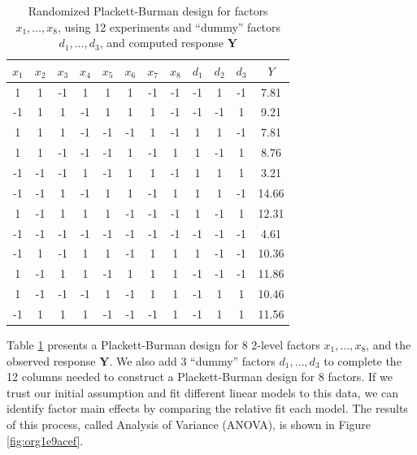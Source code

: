 \documentclass[conference]{IEEEtran}
\begin{document}
\begin{table}[ht]
\centering
\caption{Randomized Plackett-Burman design for factors $x_1, \dots, x_8$, using 12 experiments and ``dummy'' factors $d_1, \dots, d_3$, and computed response $\mathbf{Y}$}
\label{tab:plackett}
\begingroup\scriptsize
\begin{tabular}{cccccccccccc}
  \toprule
$x_1$ & $x_2$ & $x_3$ & $x_4$ & $x_5$ & $x_6$ & $x_7$ & $x_8$ & $d_1$ & $d_2$ & $d_3$ & $Y$ \\
  \midrule
1 & 1 & -1 & 1 & 1 & 1 & -1 & -1 & -1 & 1 & -1 & 7.81 \\
  -1 & 1 & 1 & -1 & 1 & 1 & 1 & -1 & -1 & -1 & 1 & 9.21 \\
  1 & 1 & 1 & -1 & -1 & -1 & 1 & -1 & 1 & 1 & -1 & 7.81 \\
  1 & 1 & -1 & -1 & -1 & 1 & -1 & 1 & 1 & -1 & 1 & 8.76 \\
  -1 & -1 & -1 & 1 & -1 & 1 & 1 & -1 & 1 & 1 & 1 & 3.21 \\
  -1 & -1 & 1 & -1 & 1 & 1 & -1 & 1 & 1 & 1 & -1 & 14.66 \\
  1 & -1 & 1 & 1 & 1 & -1 & -1 & -1 & 1 & -1 & 1 & 12.31 \\
  -1 & -1 & -1 & -1 & -1 & -1 & -1 & -1 & -1 & -1 & -1 & 4.61 \\
  -1 & 1 & -1 & 1 & 1 & -1 & 1 & 1 & 1 & -1 & -1 & 10.36 \\
  1 & -1 & 1 & 1 & -1 & 1 & 1 & 1 & -1 & -1 & -1 & 11.86 \\
  1 & -1 & -1 & -1 & 1 & -1 & 1 & 1 & -1 & 1 & 1 & 10.46 \\
  -1 & 1 & 1 & 1 & -1 & -1 & -1 & 1 & -1 & 1 & 1 & 11.56 \\
   \bottomrule
\end{tabular}
\endgroup
\end{table}

Table \ref{tab:plackett} presents a Plackett-Burman design for 8 2-level factors
\(x_1,\dots,x_8\), and the observed response \(\mathbf{Y}\). We also add 3 ``dummy''
factors \(d_1,\dots,d_3\) to complete the 12 columns needed to construct a
Plackett-Burman design for 8 factors. If we trust our initial assumption and fit
different linear models to this data, we can identify factor main effects by
comparing the relative fit each model. The results of this process, called
Analysis of Variance (ANOVA), is shown in Figure \ref{fig:org1e9acef}.
\end{document}
